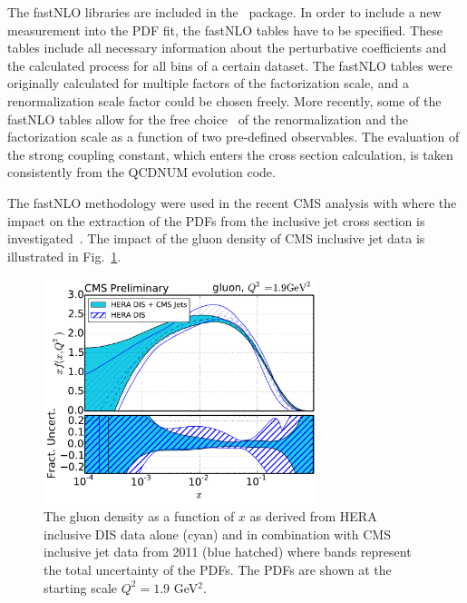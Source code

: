 \begin{description}
\begin{itemize}
The fastNLO libraries are included in the \fitter\ package.
In order to include a new measurement into the PDF fit,
the fastNLO tables have to be specified. These tables include all
necessary information about the perturbative coefficients and the
calculated process for all bins of a certain dataset. 
%
The fastNLO tables were originally calculated
for multiple factors of the factorization scale, 
and a renormalization scale factor could be chosen freely.
More recently, some of the fastNLO tables allow for 
the free choice~\cite{Britzger:2012bs} of the renormalization and the factorization
scale as a function of two pre-defined observables.
The evaluation of the strong coupling constant, which enters
the cross section calculation, is taken consistently from the 
QCDNUM evolution code.

The fastNLO methodology were used in the recent CMS analysis with \fitter where the impact
on the extraction of the PDFs from the inclusive jet cross section is investigated~\cite{cms:jets}. 
The impact of the gluon density of CMS inclusive jet data is illustrated in Fig.~\ref{fig:cmsjet}.
\begin{figure}[!ht]
   \centering
   \includegraphics[width=8cm]{CMSjets.pdf}
   \caption{The gluon density as a function of $x$ as derived from HERA inclusive DIS data 
            alone (cyan) and in combination with CMS inclusive jet data from 2011 (blue hatched)
            where bands represent the total uncertainty of the PDFs. 
            The PDFs are shown at the starting scale $Q^2= 1.9$ GeV$^2$.}
 \label{fig:cmsjet}
\end{figure}


\end{itemize}

\end{description}

